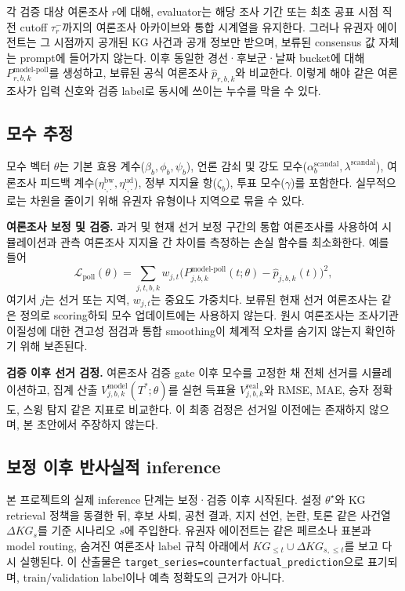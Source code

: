 \documentclass[11pt]{article}
\begin{document}
각 검증 대상 여론조사 $r$에 대해, evaluator는 해당 조사 기간 또는 최초 공표 시점 직전 cutoff $\tau_r^-$까지의 여론조사 아카이브와 통합 시계열을 유지한다. 그러나 유권자 에이전트는 그 시점까지 공개된 KG 사건과 공개 정보만 받으며, 보류된 consensus 값 자체는 prompt에 들어가지 않는다. 이후 동일한 경선·후보군·날짜 bucket에 대해 $P^{\text{model-poll}}_{r,b,k}$를 생성하고, 보류된 공식 여론조사 $\hat p_{r,b,k}$와 비교한다. 이렇게 해야 같은 여론조사가 입력 신호와 검증 label로 동시에 쓰이는 누수를 막을 수 있다.

\subsection{모수 추정}

모수 벡터 $\theta$는 기본 효용 계수($\beta_b, \phi_b, \psi_b$), 언론 감쇠 및 강도 모수($\alpha^{\text{scandal}}_b, \lambda^{\text{scandal}}$), 여론조사 피드백 계수($\eta^{\text{bw}}_{\cdot,\cdot}, \eta^{\text{ud}}_{\cdot,\cdot}$), 정부 지지율 항($\zeta_b$), 투표 모수($\gamma$)를 포함한다. 실무적으로는 차원을 줄이기 위해 유권자 유형이나 지역으로 묶을 수 있다.

\textbf{여론조사 보정 및 검증.} 과거 및 현재 선거 보정 구간의 통합 여론조사를 사용하여 시뮬레이션과 관측 여론조사 지지율 간 차이를 측정하는 손실 함수를 최소화한다. 예를 들어
\begin{equation}
\mathcal{L}_{\text{poll}}(\theta) = \sum_{j,t,b,k} w_{j,t} \Big(P^{\text{model-poll}}_{j,b,k}(t; \theta) - \hat p_{j,b,k}(t)\Big)^2,
\end{equation}
여기서 $j$는 선거 또는 지역, $w_{j,t}$는 중요도 가중치다. 보류된 현재 선거 여론조사는 같은 정의로 scoring하되 모수 업데이트에는 사용하지 않는다. 원시 여론조사는 조사기관 이질성에 대한 견고성 점검과 통합 smoothing이 체계적 오차를 숨기지 않는지 확인하기 위해 보존된다.

\textbf{검증 이후 선거 검정.} 여론조사 검증 gate 이후 모수를 고정한 채 전체 선거를 시뮬레이션하고, 집계 산출 $V^{\text{model}}_{j,b,k}(T^*; \theta)$를 실현 득표율 $V^{\text{real}}_{j,b,k}$와 RMSE, MAE, 승자 정확도, 스윙 탐지 같은 지표로 비교한다. 이 최종 검정은 선거일 이전에는 존재하지 않으며, 본 초안에서 주장하지 않는다.

\subsection{보정 이후 반사실적 inference}

본 프로젝트의 실제 inference 단계는 보정·검증 이후 시작된다. 설정 $\theta^\star$와 KG retrieval 정책을 동결한 뒤, 후보 사퇴, 공천 결과, 지지 선언, 논란, 토론 같은 사건열 $\Delta KG_s$를 기준 시나리오 $s$에 주입한다. 유권자 에이전트는 같은 페르소나 표본과 model routing, 숨겨진 여론조사 label 규칙 아래에서 $KG_{\le t} \cup \Delta KG_{s,\le t}$를 보고 다시 실행된다. 이 산출물은 \texttt{target\_series=counterfactual\_prediction}으로 표기되며, train/validation label이나 예측 정확도의 근거가 아니다.
\end{document}
